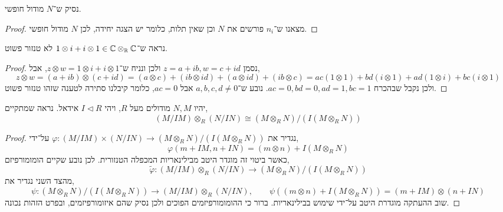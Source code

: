 \subquestion{}
נסיק ש־$N$ מודול חופשי.
\begin{proof}
	מצאנו ש־$n_i$ פורשים את $N$ וכן שאין תלות, כלומר יש הצגה יחידה, לכן $N$ מודול חופשי.
\end{proof}

\question{}
נראה ש־$1 \otimes i + i \otimes 1 \in \mathbb{C} \otimes_{\mathbb{R}} \mathbb{C}$ לא טנזור פשוט.
\begin{proof}
	נסמן $z = a + i b, w = c + i d$ ולכן ונניח ש־$z \otimes w = 1 \otimes i + i \otimes 1$, אבל,
	\[
		z \otimes w
		= (a + i b) \otimes (c + i d)
		= (a \otimes c) + (i b \otimes i d) + (a \otimes i d) + (i b \otimes c)
		= a c (1 \otimes 1) + b d (i \otimes 1) + a d (1 \otimes i) + b c (i \otimes 1)
	\]
	ולכן נקבל שבהכרח $a c = 0, b d = 0, a d = 1, b c = 1$.
	נובע ש־$a, b, c, d \ne 0$ אבל $a c = 0$, כלומר קיבלנו סתירה לטענה שזהו טנזור פשוט.
\end{proof}

\question{}
יהיו $N, M$ מודולים מעל $R$, ויהי $I \triangleleft R$ אידאל.
נראה שמתקיים,
\[
	(M / I M) \otimes_R (N / I N)
	\cong (M \otimes_R N) / (I (M \otimes_R N))
\]
\begin{proof}
	נגדיר את $\varphi : (M / I M) \times (N / I N) \to (M \otimes_R N) / (I (M \otimes_R N))$ על־ידי,
	\[
		\varphi(m + I M, n + I N)
		= (m \otimes n) + I (M \otimes_R N)
	\]
	כאשר ביטוי זה מוגדר היטב מבילינאריות המכפלה הטנזורית.
	לכן נובע שקיים הומומורפיזם,
	\[
		\tilde{\varphi} : (M / I M) \otimes_R (N / I N) \to (M \otimes_R N) / (I (M \otimes_R N))
	\]
	מהצד השני נגדיר את,
	\[
		\psi : (M \otimes_R N) / (I (M \otimes_R N)) \to (M / I M) \otimes_R (N / I N),
		\qquad
		\psi((m \otimes n) + I (M \otimes_R N))
		= (m + I M) \otimes (n + I N)
	\]
	שוב ההעתקה מוגדרת היטב על־ידי שימוש בבילינאריות.
	ברור כי ההומומורפיזמים הפוכים ולכן נסיק שהם איזומורפיזמים, ובפרט הזהות נכונה.
\end{proof}

